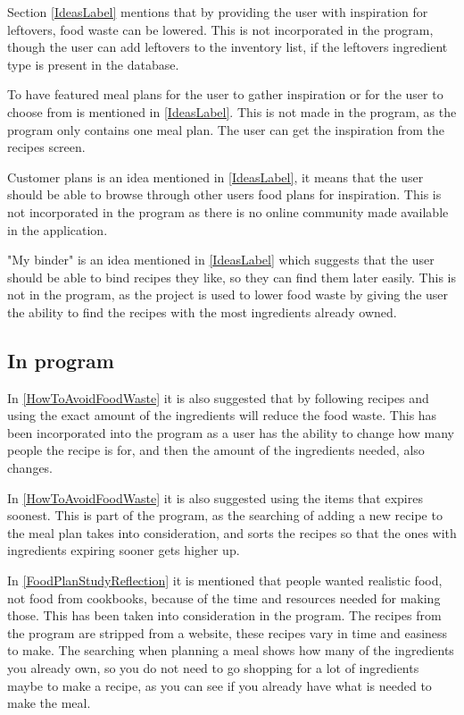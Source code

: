 Section \ref{IdeasLabel} mentions that by providing the user with inspiration for leftovers, food waste can be lowered. This is not incorporated in the program, though the user can add leftovers to the inventory list, if the leftovers ingredient type is present in the database.

To have featured meal plans for the user to gather inspiration or for the user to choose from is mentioned in \cref{IdeasLabel}. This is not made in the program, as the program only contains one meal plan. The user can get the inspiration from the recipes screen.

Customer plans is an idea mentioned in \cref{IdeasLabel}, it means that the user should be able to browse through other users food plans for inspiration. This is not incorporated in the program as there is no online community made available in the application.

"My binder" is an idea mentioned in \cref{IdeasLabel} which suggests that the user should be able to bind recipes they like, so they can find them later easily. This is not in the program, as the project is used to lower food waste by giving the user the ability to find the recipes with the most ingredients already owned.

\subsection{In program}

In \cref{HowToAvoidFoodWaste} it is also suggested that by following recipes and using the exact amount of the ingredients will reduce the food waste. This has been incorporated into the program as a user has the ability to change how many people the recipe is for, and then the amount of the ingredients needed, also changes.

In \cref{HowToAvoidFoodWaste} it is also suggested using the items that expires soonest. This is part of the program, as the searching of adding a new recipe to the meal plan takes into consideration, and sorts the recipes so that the ones with ingredients expiring sooner gets higher up.

In \cref{FoodPlanStudyReflection} it is mentioned that people wanted realistic food, not food from cookbooks, because of the time and resources needed for making those. This has been taken into consideration in the program. The recipes from the program are stripped from a website, these recipes vary in time and easiness to make. The searching when planning a meal shows how many of the ingredients you already own, so you do not need to go shopping for a lot of ingredients maybe to make a recipe, as you can see if you already have what is needed to make the meal.

